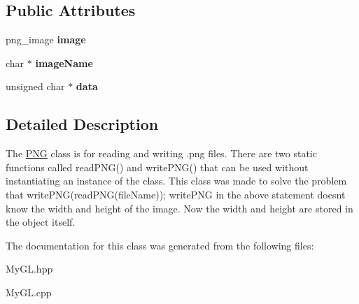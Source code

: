 \subsection*{Public Attributes}
\begin{DoxyCompactItemize}
\item 
png\+\_\+image {\bfseries image}\hypertarget{classPNG_adcccee60854d7ef75c4f516b26d9be7e}{}\label{classPNG_adcccee60854d7ef75c4f516b26d9be7e}

\item 
char $\ast$ {\bfseries image\+Name}\hypertarget{classPNG_af06d37031363a6e28cd16cde17fe87bf}{}\label{classPNG_af06d37031363a6e28cd16cde17fe87bf}

\item 
unsigned char $\ast$ {\bfseries data}\hypertarget{classPNG_af96e0999d0c4b3fb0219462daf297d92}{}\label{classPNG_af96e0999d0c4b3fb0219462daf297d92}

\end{DoxyCompactItemize}


\subsection{Detailed Description}
The \hyperlink{classPNG}{P\+NG} class is for reading and writing \textquotesingle{}.png\textquotesingle{} files. There are two static functions called read\+P\+N\+G() and write\+P\+N\+G() that can be used without instantiating an instance of the class. This class was made to solve the problem that write\+P\+N\+G(read\+P\+N\+G(file\+Name)); write\+P\+NG in the above statement doesn\textquotesingle{}t know the width and height of the image. Now the width and height are stored in the object itself. 

The documentation for this class was generated from the following files\+:\begin{DoxyCompactItemize}
\item 
My\+G\+L.\+hpp\item 
My\+G\+L.\+cpp\end{DoxyCompactItemize}
